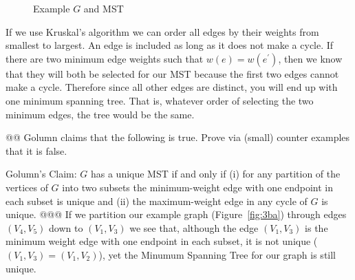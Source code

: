 \documentclass[10pt]{article}\usepackage[]{graphicx}\usepackage[]{xcolor}
\newenvironment{knitrout}{}{} %
\begin{document}
\begin{easylist}[enumerate]
\begin{knitrout}
\begin{figure}[H]
{{}

}
\caption[Example $G$ and MST]{Example $G$ and MST\label{fig:ps8.3a}}
\end{figure}


\end{knitrout}


    If we use Kruskal's algorithm we can order all edges by their weights from smallest to largest. An edge is included
    as long as it does not make a cycle. If there are two minimum edge weights such that $w(e) = w(e^\prime)$, then we
    know that they will both be selected for our MST because the first two edges cannot make a cycle. Therefore since
    all other edges are distinct, you will end up with one minimum spanning tree. That is, whatever order of selecting
    the two minimum edges, the tree would be the same.

    @@ Golumn claims that the following is true. Prove via (small) counter examples that it is false.

    Golumn's Claim: $G$ has a unique MST if and only if (i) for any partition of the vertices of $G$ into two subsets
    the minimum-weight edge with one endpoint in each subset is unique and (ii) the maximum-weight edge in any cycle of
    $G$ is unique.
    @@@ If we partition our example graph (Figure~\ref{fig:3ba}) through edges $(V_4 , V_5)$ down to $(V_1, V_3)$ we see
    that, although the edge $(V_1, V_3)$ is the minimum weight edge with one endpoint in each subset, it is not unique
    ($(V_1 , V_3) = (V_1, V_2)$), yet the Minumum Spanning Tree for our graph is still unique.


\end{easylist}
\end{document}
